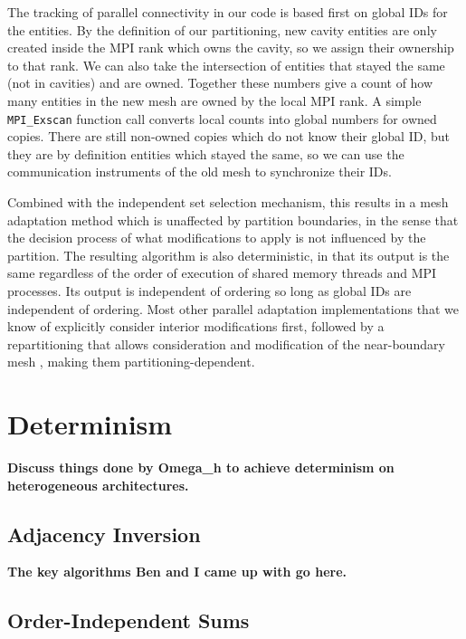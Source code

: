 The tracking of parallel connectivity in our code is based first on global
IDs for the entities.
By the definition of our partitioning, new cavity entities are only created
inside the MPI rank which owns the cavity, so we assign their ownership
to that rank.
We can also take the intersection of entities that stayed the same
(not in cavities) and are owned.
Together these numbers give a count of how many entities in the new mesh are owned
by the local MPI rank.
A simple \texttt{MPI\_Exscan} function call converts local counts into
global numbers for owned copies.
There are still non-owned copies which do not know their global ID, but they
are by definition entities which stayed the same, so we can use the
communication instruments of the old mesh to synchronize their IDs.

Combined with the independent set selection mechanism, this results
in a mesh adaptation method which is unaffected by partition boundaries,
in the sense that the decision process of what modifications to apply
is not influenced by the partition.
The resulting algorithm is also deterministic,
in that its output is the same regardless of the order of
execution of shared memory threads and MPI processes.
Its output is independent
of ordering so long as global IDs are independent of ordering.
Most other parallel adaptation implementations that we know of explicitly
consider interior modifications first, followed by a repartitioning that
allows consideration and modification of the near-boundary mesh
\cite{loseille2015parallel,de1999parallel}, making them
partitioning-dependent.

\section{Determinism}
\label{sec:determinism}

{\bf Discuss things done by Omega\_h to achieve
determinism on heterogeneous architectures.}

\subsection{Adjacency Inversion}

{\bf The key algorithms Ben and I came up with go here.}

\subsection{Order-Independent Sums}


